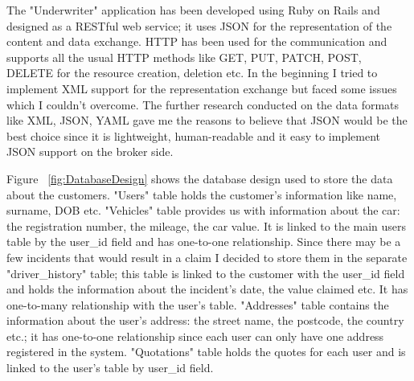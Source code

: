 \documentclass[10pt,a4paper,headinclude=true,twoside]{report}
\begin{document}
The "Underwriter" application has been developed using Ruby on Rails and designed as a RESTful web service; it uses JSON for the representation of the content and data exchange. HTTP has been used for the communication and supports all the usual HTTP methods like GET, PUT, PATCH, POST, DELETE for the resource creation, deletion etc. In the beginning I tried to implement XML support for the representation exchange but faced some issues which I couldn't overcome. The further research conducted on the data formats like XML, JSON, YAML gave me the reasons to believe that JSON would be the best choice since it is lightweight, human-readable and it easy to implement JSON support on the broker side.

Figure ~\ref{fig:DatabaseDesign} shows the database design used to store the data about the customers. "Users" table holds the customer's information like name, surname, DOB etc. "Vehicles" table provides us with information about the car: the registration number, the mileage, the car value. It is linked to the main users table by the user\_id field and has one-to-one relationship. Since there may be a few incidents that would result in a claim I decided to store them in the separate "driver\_history" table; this table is linked to the customer with the user\_id field and holds the information about the incident's date,  the value claimed etc. It has one-to-many relationship with the user's table. "Addresses" table contains the information about the user's address: the street name, the postcode, the country etc.; it has one-to-one relationship since each user can only have one address registered in the system. "Quotations" table holds the quotes for each user and is linked to the user's table by user\_id field.    
\end{document}
